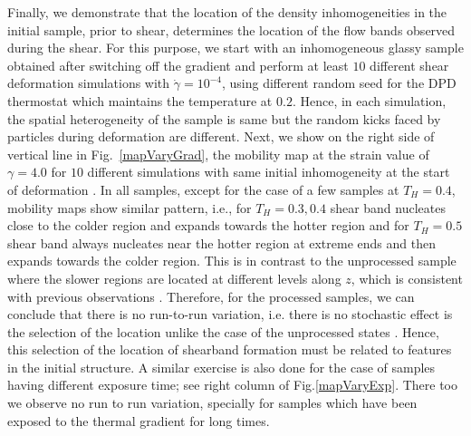 Finally, we demonstrate that the location of the density inhomogeneities in the initial sample, prior to shear, determines the location of the flow bands observed during the shear.
For this purpose, we start with an inhomogeneous glassy sample obtained after switching off the gradient and perform at least $10$ different shear deformation simulations with $\dot{\gamma} = 10^{-4}$, using different random seed for the DPD thermostat which maintains the temperature at $0.2$. Hence, in each simulation, the spatial heterogeneity of the sample is same but the random kicks faced by particles during deformation are different. 
Next, we show on the right side of vertical line in Fig.~\ref{mapVaryGrad}, the mobility map at the strain value of $\gamma = 4.0$ for $10$ different simulations with same initial inhomogeneity at the start of deformation . In all samples, except for the case of a few samples at $T_H = 0.4$, mobility maps show similar  pattern, i.e., for $T_H = 0.3, 0.4$ shear band nucleates close to the colder region and expands towards the hotter region and for $T_H = 0.5$ shear band always nucleates near the hotter region at extreme ends and then expands towards the colder region. This is in contrast to the unprocessed sample where the slower regions are located at different levels along $z$, which is consistent with previous observations \cite{golkia2020}. Therefore, for the processed samples, we can conclude that there is no run-to-run variation, i.e. there is no stochastic effect is the selection of the location unlike the case of the unprocessed states \cite{golkia2020}. Hence, this selection of the location of shearband formation must be related to features in the initial structure. A similar exercise is also done for the case of samples having different exposure time; see right column of Fig.\ref{mapVaryExp}. There too we observe no run to run variation, specially for samples which have been exposed to the thermal gradient for long times. 

